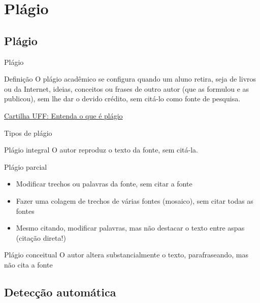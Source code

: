 \documentclass{beamer}
\begin{document}
\section{Plágio}

\subsection{Plágio}

\begin{frame}{Plágio}
  \begin{block}{Definição}
    \footnotesize
    O plágio acadêmico se configura quando um aluno retira, seja de
    livros ou da Internet, ideias, conceitos ou frases de outro autor
    (que as formulou e as publicou), sem lhe dar o devido crédito, sem
    citá-lo como fonte de pesquisa.
  \end{block}

  \vfill
  \scriptsize
  \hfill \href{{http://www.noticias.uff.br/arquivos/cartilha-sobre-plagio-academico.pdf}}
  {Cartilha UFF: Entenda o que é plágio}
\end{frame}

\begin{frame}{Tipos de plágio}
  \begin{block}{Plágio integral}
    \footnotesize
    O autor \alert{reproduz} o texto da fonte, sem citá-la.
  \end{block}
  \bigskip
  \begin{block}{Plágio parcial}
    \begin{itemize}
      \footnotesize
    \item Modificar trechos ou palavras da fonte, sem citar a fonte
    \item Fazer uma colagem de trechos de várias fontes (mosaico), sem
      citar \alert{todas} as fontes
    \item \alert{Mesmo citando}, modificar palavras, mas não destacar
      o texto entre aspas (citação direta!)
    \end{itemize}
  \end{block}
  \bigskip
  \begin{block}{Plágio conceitual}
    \footnotesize
    O autor altera substancialmente o texto, parafraseando, mas não
    cita a fonte
  \end{block}
\end{frame}

\subsection{Detecção automática}
\end{document}
